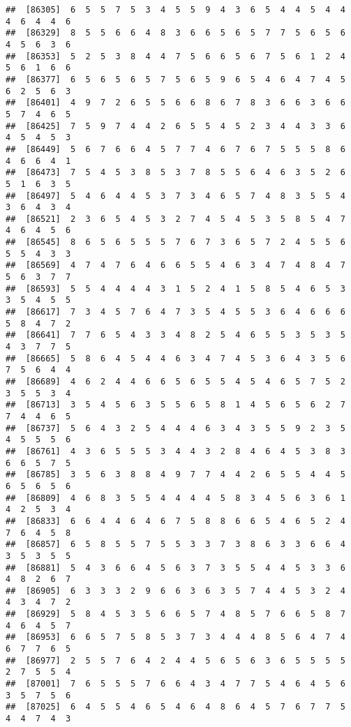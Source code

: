 \documentclass[
]{book}
\begin{document}
\begin{verbatim}
##  [86305]  6  5  5  7  5  3  4  5  5  9  4  3  6  5  4  4  5  4  4  4  6  4  4  6
##  [86329]  8  5  5  6  6  4  8  3  6  6  5  6  5  7  7  5  6  5  6  4  5  6  3  6
##  [86353]  5  2  5  3  8  4  4  7  5  6  6  5  6  7  5  6  1  2  4  5  6  1  6  6
##  [86377]  6  5  6  5  6  5  7  5  6  5  9  6  5  4  6  4  7  4  5  6  2  5  6  3
##  [86401]  4  9  7  2  6  5  5  6  6  8  6  7  8  3  6  6  3  6  6  5  7  4  6  5
##  [86425]  7  5  9  7  4  4  2  6  5  5  4  5  2  3  4  4  3  3  6  4  5  4  5  3
##  [86449]  5  6  7  6  6  4  5  7  7  4  6  7  6  7  5  5  5  8  6  4  6  6  4  1
##  [86473]  7  5  4  5  3  8  5  3  7  8  5  5  6  4  6  3  5  2  6  5  1  6  3  5
##  [86497]  5  4  6  4  4  5  3  7  3  4  6  5  7  4  8  3  5  5  4  3  6  4  3  4
##  [86521]  2  3  6  5  4  5  3  2  7  4  5  4  5  3  5  8  5  4  7  4  6  4  5  6
##  [86545]  8  6  5  6  5  5  5  7  6  7  3  6  5  7  2  4  5  5  6  5  5  4  3  3
##  [86569]  4  7  4  7  6  4  6  6  5  5  4  6  3  4  7  4  8  4  7  5  6  3  7  7
##  [86593]  5  5  4  4  4  4  3  1  5  2  4  1  5  8  5  4  6  5  3  3  5  4  5  5
##  [86617]  7  3  4  5  7  6  4  7  3  5  4  5  5  3  6  4  6  6  6  5  8  4  7  2
##  [86641]  7  7  6  5  4  3  3  4  8  2  5  4  6  5  5  3  5  3  5  4  3  7  7  5
##  [86665]  5  8  6  4  5  4  4  6  3  4  7  4  5  3  6  4  3  5  6  7  5  6  4  4
##  [86689]  4  6  2  4  4  6  6  5  6  5  5  4  5  4  6  5  7  5  2  3  5  5  3  4
##  [86713]  3  5  4  5  6  3  5  5  6  5  8  1  4  5  6  5  6  2  7  7  4  4  6  5
##  [86737]  5  6  4  3  2  5  4  4  4  6  3  4  3  5  5  9  2  3  5  4  5  5  5  6
##  [86761]  4  3  6  5  5  5  3  4  4  3  2  8  4  6  4  5  3  8  3  6  6  5  7  5
##  [86785]  3  5  6  3  8  8  4  9  7  7  4  4  2  6  5  5  4  4  5  6  5  6  5  6
##  [86809]  4  6  8  3  5  5  4  4  4  4  5  8  3  4  5  6  3  6  1  4  2  5  3  4
##  [86833]  6  6  4  4  6  4  6  7  5  8  8  6  6  5  4  6  5  2  4  7  6  4  5  8
##  [86857]  6  5  8  5  5  7  5  5  3  3  7  3  8  6  3  3  6  6  4  3  5  3  5  5
##  [86881]  5  4  3  6  6  4  5  6  3  7  3  5  5  4  4  5  3  3  6  4  8  2  6  7
##  [86905]  6  3  3  3  2  9  6  6  3  6  3  5  7  4  4  5  3  2  4  4  3  4  7  2
##  [86929]  5  8  4  5  3  5  6  6  5  7  4  8  5  7  6  6  5  8  7  4  6  4  5  7
##  [86953]  6  6  5  7  5  8  5  3  7  3  4  4  4  8  5  6  4  7  4  6  7  7  6  5
##  [86977]  2  5  5  7  6  4  2  4  4  5  6  5  6  3  6  5  5  5  5  2  7  5  5  4
##  [87001]  7  6  5  5  5  7  6  6  4  3  4  7  7  5  4  6  4  5  6  3  5  7  5  6
##  [87025]  6  4  5  5  4  6  5  4  6  4  8  6  4  5  7  6  7  7  5  4  4  7  4  3

\end{verbatim}
\end{document}
